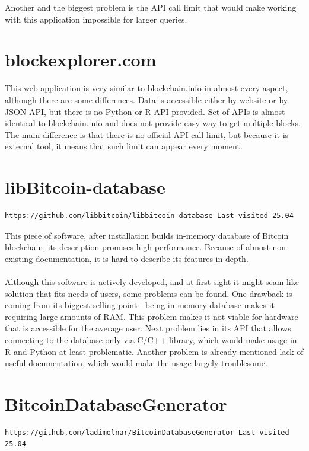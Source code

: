 \documentclass[12pt, en, eng, oneside]{mgr}
\begin{document}
Another and the biggest problem is the API call limit that would make working with this application impossible for larger queries.

\section{blockexplorer.com}

This web application is very similar to blockchain.info in almost every aspect, although there are some differences. Data is accessible either by website or by JSON API, but there is no Python or R API provided. Set of APIs is almost identical to blockchain.info and does not provide easy way to get multiple blocks. The main difference is that there is no official API call limit, but because it is external tool, it means that such limit can appear every moment.

\section{libBitcoin-database}

\begin{verbatim}
https://github.com/libbitcoin/libbitcoin-database Last visited 25.04
\end{verbatim}

This piece of software, after installation builds in-memory database of Bitcoin blockchain, its description promises high performance. Because of almost non existing documentation, it is hard to describe its features in depth.
\\
\\
Although this software is actively developed, and at first sight it might seam like solution that fits needs of users, some problems can be found. One drawback is coming from its biggest selling point - being in-memory database makes it requiring large amounts of RAM. This problem makes it not viable for hardware that is accessible for the average user. Next problem lies in its API that allows connecting to the database only via C/C++ library, which would make usage in R and Python at least problematic. Another problem is already mentioned lack of useful documentation, which would make the usage largely troublesome.

\section{BitcoinDatabaseGenerator}

\begin{verbatim}
https://github.com/ladimolnar/BitcoinDatabaseGenerator Last visited 25.04
\end{verbatim}
\end{document}
